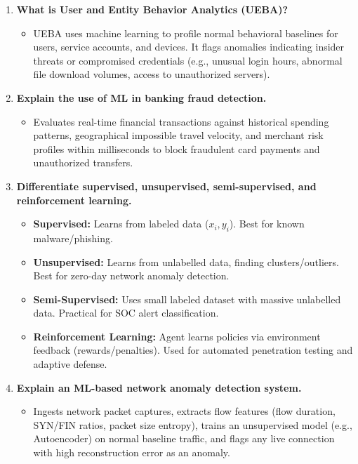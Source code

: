 \begin{enumerate}[label=\textbf{Q\arabic*.,resume},leftmargin=1.2cm]
\item \textbf{What is User and Entity Behavior Analytics (UEBA)?}
\begin{itemize}
\item UEBA uses machine learning to profile normal behavioral baselines for users, service accounts, and devices. It flags anomalies indicating insider threats or compromised credentials (e.g., unusual login hours, abnormal file download volumes, access to unauthorized servers).
\end{itemize}

\item \textbf{Explain the use of ML in banking fraud detection.}
\begin{itemize}
\item Evaluates real-time financial transactions against historical spending patterns, geographical impossible travel velocity, and merchant risk profiles within milliseconds to block fraudulent card payments and unauthorized transfers.
\end{itemize}

\item \textbf{Differentiate supervised, unsupervised, semi-supervised, and reinforcement learning.}
\begin{itemize}
\item \textbf{Supervised:} Learns from labeled data ($x_i, y_i$). Best for known malware/phishing.
\item \textbf{Unsupervised:} Learns from unlabelled data, finding clusters/outliers. Best for zero-day network anomaly detection.
\item \textbf{Semi-Supervised:} Uses small labeled dataset with massive unlabelled data. Practical for SOC alert classification.
\item \textbf{Reinforcement Learning:} Agent learns policies via environment feedback (rewards/penalties). Used for automated penetration testing and adaptive defense.
\end{itemize}

\item \textbf{Explain an ML-based network anomaly detection system.}
\begin{itemize}
\item Ingests network packet captures, extracts flow features (flow duration, SYN/FIN ratios, packet size entropy), trains an unsupervised model (e.g., Autoencoder) on normal baseline traffic, and flags any live connection with high reconstruction error as an anomaly.
\end{itemize}


\end{enumerate}
